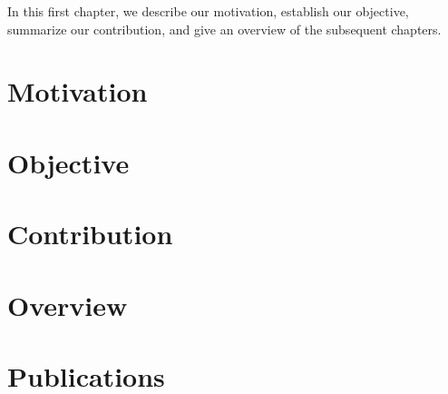 In this first chapter, we describe our motivation, establish our objective,
summarize our contribution, and give an overview of the subsequent chapters.

\section{Motivation}

\section{Objective}

\section{Contribution}

\section{Overview}

\section{Publications}
